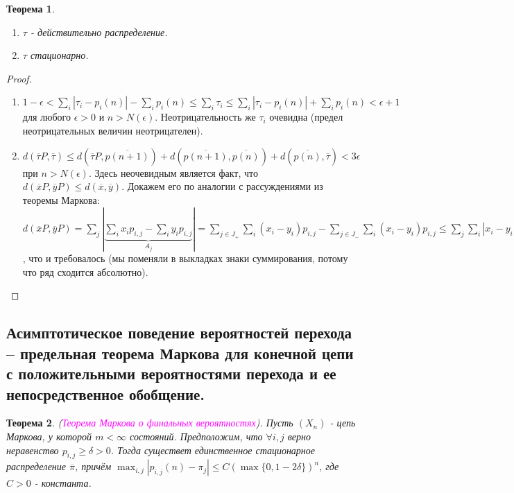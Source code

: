 \documentclass[a4paper,100pt]{article}
\theoremstyle{indented}
\newtheorem{theorem}{Теорема}
\theoremstyle{definition}
\theoremstyle{remark}
\begin{document}
\begin{theorem} \
  \begin{enumerate}
    \item $\tau$ - действительно распределение.
    \item $\tau$ стационарно.
  \end{enumerate}
\end{theorem}
  
\begin{proof}
  \begin{enumerate}
      \item $1-\epsilon< \sum_i |\tau_i-p_i(n)| - \sum_i p_i(n) \leq \sum_i \tau_i \leq \sum_i |\tau_i-p_i(n)| + \sum_i p_i(n) < \epsilon + 1$ для любого $\epsilon>0$ и $n> N(\epsilon)$. Неотрицательность же $\tau_i$ очевидна (предел неотрицательных величин неотрицателен).
      \item $d(\overline{\tau}P, \overline{\tau}) \leq d(\overline{\tau}P, \overline{p(n+1)})+d(\overline{p(n+1)}, \overline{p(n)})+d(\overline{p(n)}, \overline{\tau}) < 3\epsilon$ при $n>N(\epsilon)$. Здесь неочевидным является факт, что $d(\overline{x}P, \overline{y}P) \leq d(\overline{x}, \overline{y})$. Докажем его по аналогии с рассуждениями из теоремы Маркова: $d(\overline{x}P, \overline{y}P)=\sum_j|\underbrace{\sum_{i}x_ip_{i, j} - \sum_{i}y_ip_{i, j}}_{A_j}|=\sum_{j \in J_+} \sum_{i}(x_i-y_i)p_{i, j}-\sum_{j \in J_-} \sum_{i}(x_i-y_i)p_{i, j} \leq \sum_j \sum_{i}|x_i-y_i|p_{i, j} = \sum_i |x_i-y_i| \sum_{j} p_{i, j}=d(\overline{x}, \overline{y})$, что и требовалось (мы поменяли в выкладках знаки суммирования, потому что ряд сходится абсолютно).
  \end{enumerate}
\end{proof}

\subsection{Асимптотическое поведение вероятностей перехода – предельная теорема Маркова для конечной цепи с положительными вероятностями перехода и ее непосредственное обобщение.} 

\begin{theorem}
  (\hypertarget{n35}{\textcolor{magenta}{\textit{Теорема Маркова о финальных вероятностях}}}). Пусть $(X_n)$ - цепь Маркова, у которой $m<\infty$ состояний. Предположим, что $\forall i, j$ верно неравенство  $p_{i, j} \geq \delta>0$. Тогда существет единственное стационарное распределение $\overline{\pi}$, причём $\max_{i, j} |p_{i, j}(n)-\pi_j|  \leq C(\max\{0, 1-2\delta\})^n$, где $C>0$ - константа.
\end{theorem}
\end{document}
